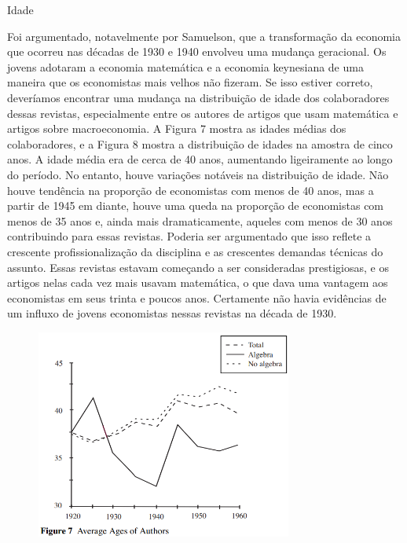 \documentclass[12pt]{article}
\begin{document}
Idade

Foi argumentado, notavelmente por Samuelson, que a transformação da economia que ocorreu nas décadas de 1930 e 1940 envolveu uma mudança geracional. Os jovens adotaram a economia matemática e a economia keynesiana de uma maneira que os economistas mais velhos não fizeram. Se isso estiver correto, deveríamos encontrar uma mudança na distribuição de idade dos colaboradores dessas revistas, especialmente entre os autores de artigos que usam matemática e artigos sobre macroeconomia. A Figura 7 mostra as idades médias dos colaboradores, e a Figura 8 mostra a distribuição de idades na amostra de cinco anos. A idade média era de cerca de 40 anos, aumentando ligeiramente ao longo do período. No entanto, houve variações notáveis na distribuição de idade. Não houve tendência na proporção de economistas com menos de 40 anos, mas a partir de 1945 em diante, houve uma queda na proporção de economistas com menos de 35 anos e, ainda mais dramaticamente, aqueles com menos de 30 anos contribuindo para essas revistas. Poderia ser argumentado que isso reflete a crescente profissionalização da disciplina e as crescentes demandas técnicas do assunto. Essas revistas estavam começando a ser consideradas prestigiosas, e os artigos nelas cada vez mais usavam matemática, o que dava uma vantagem aos economistas em seus trinta e poucos anos. Certamente não havia evidências de um influxo de jovens economistas nessas revistas na década de 1930.

\begin{figure}[H]
    \centering
    \includegraphics[width=0.75\textwidth]{4º Período/História do Pensamento Econômico/Tradução HPE/Tradução Tópico 7.2/figure 7.png}
    \end{figure}
\end{document}
